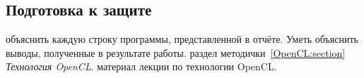 { %
	\subsection{Подготовка к защите}
	\begin{enumerate}
		 объяснить каждую строку программы, представленной в отчёте. Уметь объяснить выводы, полученные в результате работы.
		 раздел методички~\ref{OpenCL:section} \textit{Технология OpenCL}.
		 материал лекции по технологии OpenCL.
	\end{enumerate}
}